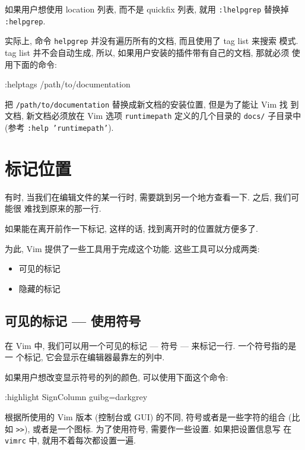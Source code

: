 \begin{warning}
    如果用户想使用 location 列表, 而不是 quickfix 列表, 就用 \texttt{:lhelpgrep}
    替换掉 \texttt{:helpgrep}.
\end{warning}

实际上, 命令 \texttt{helpgrep} 并没有遍历所有的文档, 而且使用了 tag list 来搜索
模式. tag list 并不会自动生成, 所以, 如果用户安装的插件带有自己的文档, 那就必须
使用下面的命令:
\begin{vimcode}
    :helptags /path/to/documentation
\end{vimcode}
把 \texttt{/path/to/documentation} 替换成新文档的安装位置, 但是为了能让 Vim 找
到文档, 新文档必须放在 Vim 选项 \texttt{runtimepath} 定义的几个目录的
\texttt{docs/} 子目录中 (参考 \texttt{:help 'runtimepath'}).

\section{标记位置}
\label{sec:x_marks_the_spot}

有时, 当我们在编辑文件的某一行时, 需要跳到另一个地方查看一下. 之后, 我们可能很
难找到原来的那一行.

如果能在离开前作一下标记, 这样的话, 找到离开时的位置就方便多了.

为此, Vim 提供了一些工具用于完成这个功能. 这些工具可以分成两类:
\begin{itemize}
    \item 可见的标记
    \item 隐藏的标记
\end{itemize}

\subsection{可见的标记 --- 使用符号}
\label{subsec:visible_markers_using_signs}

在 Vim 中, 我们可以用一个可见的标记 --- 符号 --- 来标记一行. 一个符号指的是一
个标记, 它会显示在编辑器最靠左的列中.

\begin{warning}
    如果用户想改变显示符号的列的颜色, 可以使用下面这个命令:
    \begin{vimcode}
    :highlight SignColumn guibg=darkgrey
    \end{vimcode}
\end{warning}

根据所使用的 Vim 版本 (控制台或 GUI) 的不同, 符号或者是一些字符的组合 (比如
\texttt{>>}), 或者是一个图标. 为了使用符号, 需要作一些设置. 如果把设置信息写
在 \texttt{vimrc} 中, 就用不着每次都设置一遍.

